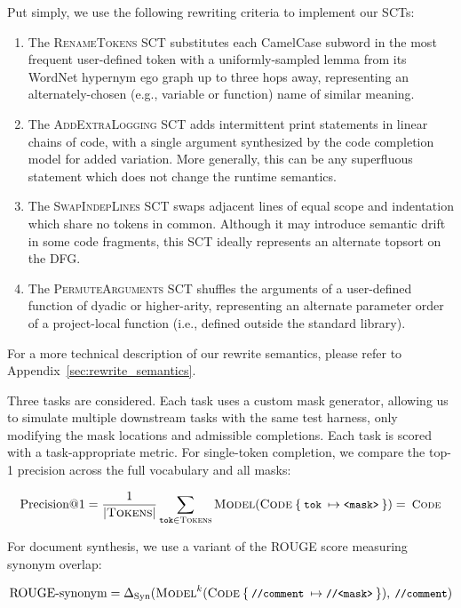 \documentclass[usenames,dvipsnames]{article} %
\begin{document}
  Put simply, we use the following rewriting criteria to implement our SCTs:

  \begin{enumerate}[itemsep=1ex]
    \item The \textsc{RenameTokens} SCT substitutes each CamelCase subword in the most frequent user-defined token with a uniformly-sampled lemma from its WordNet hypernym ego graph up to three hops away, representing an alternately-chosen (e.g., variable or function) name of similar meaning.
    \item The \textsc{AddExtraLogging} SCT adds intermittent print statements in linear chains of code, with a single argument synthesized by the code completion model for added variation. More generally, this can be any superfluous statement which does not change the runtime semantics.
    \item The \textsc{SwapIndepLines} SCT swaps adjacent lines of equal scope and indentation which share no tokens in common. Although it may introduce semantic drift in some code fragments, this SCT ideally represents an alternate topsort on the DFG.
    \item The \textsc{PermuteArguments} SCT shuffles the arguments of a user-defined function of dyadic or higher-arity, representing an alternate parameter order of a project-local function (i.e., defined outside the standard library).
  \end{enumerate}

  For a more technical description of our rewrite semantics, please refer to Appendix~\ref{sec:rewrite_semantics}.

  Three tasks are considered. Each task uses a custom mask generator, allowing us to simulate multiple downstream tasks with the same test harness, only modifying the mask locations and admissible completions. Each task is scored with a task-appropriate metric. For single-token completion, we compare the top-1 precision across the full vocabulary and all masks:

  \begin{equation*}
    \text{Precision@1} = \frac{1}{{|\textsc{Tokens}|}}\sum_{\texttt{tok}\in \textsc{Tokens}}\textsc{Model}(\textsc{Code}\:\{\:\small{\texttt{tok}}\:\mapsto\small{\texttt{<mask>}}\:\}) = \:\textsc{Code}
  \end{equation*}

  For document synthesis, we use a variant of the ROUGE score measuring synonym overlap:

  \begin{equation*}
    \text{ROUGE-synonym} = \Delta_{\text{Syn}}(\textsc{Model}^{k}(\textsc{Code}\:\{\:\small{\texttt{//comment}}\:\mapsto\texttt{//<mask>}\:\}), \:\texttt{//comment})
  \end{equation*}
\end{document}
